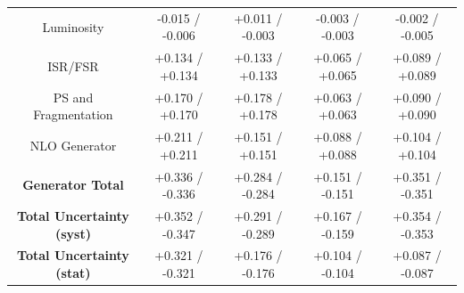 \begin{table}[htbp]
\begin{center}
\begin{tabular}{|c|c|c|c|c|}
   Luminosity                            &  -0.015   / -0.006   & +0.011   / -0.003   & -0.003   / -0.003   & -0.002   / -0.005   \\
   ISR/FSR                               &  +0.134   / +0.134   & +0.133   / +0.133   & +0.065   / +0.065   & +0.089   / +0.089   \\
   PS and Fragmentation                  &  +0.170   / +0.170   & +0.178   / +0.178   & +0.063   / +0.063   & +0.090   / +0.090   \\
   NLO Generator                         &  +0.211   / +0.211   & +0.151   / +0.151   & +0.088   / +0.088   & +0.104   / +0.104   \\
   \hline
   \textbf{Generator Total}              &  +0.336   / -0.336   & +0.284   / -0.284   & +0.151   / -0.151   & +0.351   / -0.351   \\
   \hline
   \hline
   \textbf{Total Uncertainty (syst)}     &  +0.352   / -0.347   & +0.291   / -0.289   & +0.167   / -0.159   & +0.354   / -0.353   \\
   \textbf{Total Uncertainty (stat)}     &  +0.321   / -0.321   & +0.176   / -0.176   & +0.104   / -0.104   & +0.087   / -0.087   \\
   \hline
   \end{tabular}
 
   \end{center}
 \end{table}

